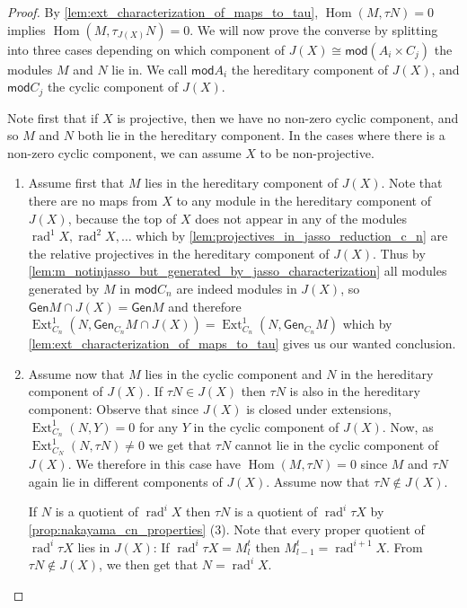 \documentclass[11pt]{amsart}
\newcommand{\Gen}{\mathsf{Gen}}
\newcommand{\mods}{\mathsf{mod}}
\DeclareMathOperator{\Hom}{\mathrm{Hom}}
\DeclareMathOperator{\Ext}{\mathrm{Ext}}
\DeclareMathOperator{\rad}{\mathrm{rad}}
\theoremstyle{definition}
\begin{document}
\begin{proof}
    By \cref{lem:ext_characterization_of_maps_to_tau}, $\Hom(M,\tau N) = 0$ implies $\Hom(M,\tau_{J(X)} N) = 0$. We will now prove the converse by splitting into three cases depending on which component of $J(X) \cong \mods( A_i \times C_j)$ the modules $M$ and $N$ lie in. We call $\mods A_i$ the hereditary component of $J(X)$, and $\mods C_j$ the cyclic component of $J(X)$. 

    Note first that if $X$ is projective, then we have no non-zero cyclic component, and so $M$ and $N$ both lie in the hereditary component. In the cases where there is a non-zero cyclic component, we can assume $X$ to be non-projective.
    

    \begin{enumerate}
        \item Assume first that $M$ lies in the hereditary component of $J(X)$. Note that there are no maps from $X$ to any module in the hereditary component of $J(X)$, because the top of $X$ does not appear in any of the modules $\rad^1 X, \rad^2 X,\dots$ which by \cref{lem:projectives_in_jasso_reduction_c_n} are the relative projectives in the hereditary component of $J(X)$. Thus by \cref{lem:m_notinjasso_but_generated_by_jasso_characterization} all modules generated by $M$ in $\mods C_n$ are indeed modules in $J(X)$, so $\Gen M \cap J(X) = \Gen M$ and therefore $\Ext^1_{C_n}(N,\Gen_{C_n} M \cap J(X)) = \Ext^1_{C_n}(N,\Gen_{C_n} M)$ which by \cref{lem:ext_characterization_of_maps_to_tau} gives us our wanted conclusion.

         \item Assume now that $M$ lies in the cyclic component and $N$ in the hereditary component of $J(X)$. If $\tau N \in J(X)$ then $\tau N$ is also in the hereditary component: Observe that since $J(X)$ is closed under extensions, $\Ext^1_{C_n}(N,Y) = 0$ for any $Y$ in the cyclic component of $J(X)$. Now, as $\Ext_{C_N}^1(N,\tau N) \neq 0$ we get that $\tau N$ cannot lie in the cyclic component of $J(X)$. 
        We therefore in this case have $\Hom(M,\tau N)  = 0$ since $M$ and $\tau N$ again lie in different components of $J(X)$. Assume now that $\tau N \notin J(X)$.

        If $N$ is a quotient of $\rad^i X$ then $\tau N$ is a quotient of $\rad^i \tau X$ by  \cref{prop:nakayama_cn_properties} (3). Note that every proper quotient of $\rad^i \tau X$ lies in $J(X)$: If $\rad^i \tau X = M^t_l$ then $M^t_{l-1} = \rad^{i+1}X$. From $\tau N \notin J(X)$, we then get that $N = \rad^i X$.
        

\end{enumerate}
\end{proof}
\end{document}
